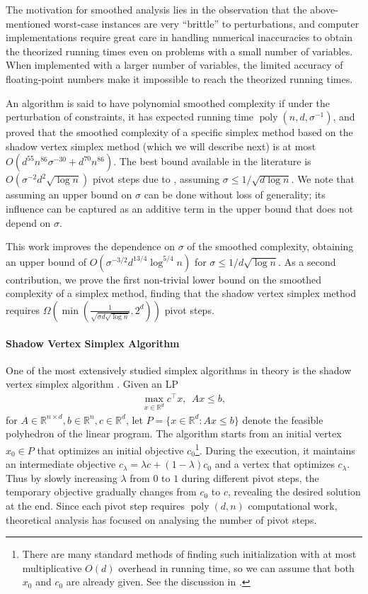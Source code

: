 \documentclass{article}\usepackage[a4paper,margin=20mm]{geometry}
\newcommand{\R}{\mathbb R}
\newcommand{\poly}{\operatorname{poly}}
\begin{document}
The motivation for smoothed analysis lies in the observation that the above-mentioned
worst-case instances are very ``brittle'' to perturbations, and computer implementations
require great care in handling numerical inaccuracies to obtain the theorized running times
even on problems with a small number of variables. When implemented with a larger number of
variables, the limited accuracy of floating-point numbers make it impossible to reach
the theorized running times.

An algorithm is said to have polynomial smoothed complexity if under the perturbation of constraints, it has expected running
time $\poly(n,d,\sigma^{-1})$, and \cite{ST04} proved that the smoothed complexity of a specific simplex method based on the shadow vertex simplex method (which we will describe next) is at most
$O(d^{55}n^{86}\sigma^{-30} + d^{70}n^{86})$.
The best bound available in the literature is
$O(\sigma^{-2}d^2\sqrt{\log n})$ pivot steps due to \cite{DH18}, assuming $\sigma \leq 1/\sqrt{d\log n}$.
We note that assuming an upper bound on $\sigma$ can be done without loss of generality;
its influence can be captured as an additive term in the upper bound that does not depend on $\sigma$.

This work improves the dependence on $\sigma$ of the smoothed complexity, obtaining an upper bound of $O(\sigma^{-3/2} d^{13/4} \log^{5/4} n)$
for $\sigma \leq 1/d\sqrt{\log n}$.
As a second contribution, we prove the first non-trivial lower bound on the smoothed complexity of a simplex method,
finding that the shadow vertex simplex method requires $\Omega(\min(\frac{1}{\sqrt{\sigma d \sqrt{\log n}}}, 2^d))$
pivot steps.


\paragraph{Shadow Vertex Simplex Algorithm}
One of the most extensively studied simplex algorithms in theory is the shadow vertex simplex algorithm \cite{gas55,b82}.
Given an LP
\begin{align*}
    \max_{x\in \R^d} c^\top x, ~~ A x \leq b,
\end{align*}
for $A \in \R^{n\times d}, b\in \R^n, c\in \R^d$,
let $P = \{x\in \R^d : A x \leq b\}$ denote the feasible polyhedron of the linear program.
The algorithm starts from an initial vertex $x_0 \in P$ that optimizes an initial objective $c_0$\footnote{There are many standard methods of finding such initialization with at most multiplicative $O(d)$ overhead in running time, so we can assume that both $x_0$ and $c_0$ are already given. See the discussion in \cite{DH18}.}.
During the execution, it maintains an intermediate objective $c_\lambda = \lambda c + (1-\lambda) c_0$ and a vertex that optimizes $c_{\lambda}$. 
Thus by slowly increasing $\lambda$ from $0$ to $1$ during different pivot steps, the temporary objective gradually changes from $c_0$ to $c$, revealing the desired solution at the end.
Since each pivot step requires $\poly(d,n)$ computational work, theoretical analysis
has focused on analysing the number of pivot steps.
\end{document}
